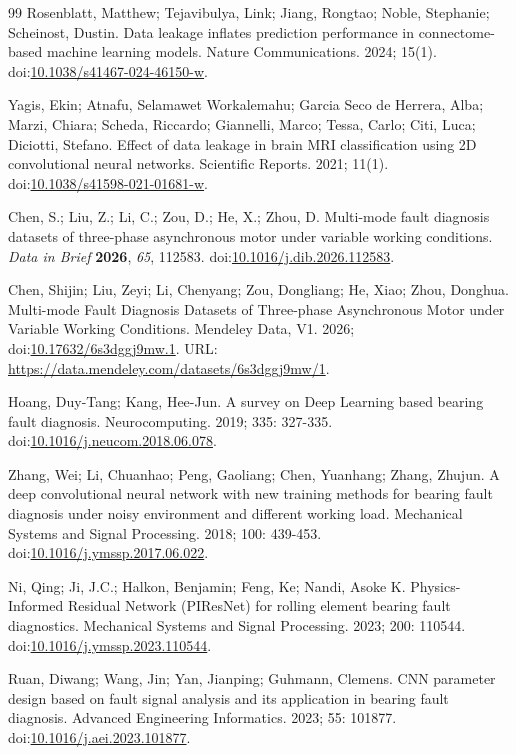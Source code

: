 \documentclass[11pt]{article}
\begin{document}
\begin{thebibliography}{99}
 Rosenblatt, Matthew; Tejavibulya, Link; Jiang, Rongtao; Noble, Stephanie; Scheinost, Dustin. Data leakage inflates prediction performance in connectome-based machine learning models. Nature Communications. 2024; 15(1). doi:\url{10.1038/s41467-024-46150-w}.

 Yagis, Ekin; Atnafu, Selamawet Workalemahu; Garcia Seco de Herrera, Alba; Marzi, Chiara; Scheda, Riccardo; Giannelli, Marco; Tessa, Carlo; Citi, Luca; Diciotti, Stefano. Effect of data leakage in brain MRI classification using 2D convolutional neural networks. Scientific Reports. 2021; 11(1). doi:\url{10.1038/s41598-021-01681-w}.

 Chen, S.; Liu, Z.; Li, C.; Zou, D.; He, X.; Zhou, D. Multi-mode fault diagnosis datasets of three-phase asynchronous motor under variable working conditions. \textit{Data in Brief} \textbf{2026}, \textit{65}, 112583. doi:\url{10.1016/j.dib.2026.112583}.

 Chen, Shijin; Liu, Zeyi; Li, Chenyang; Zou, Dongliang; He, Xiao; Zhou, Donghua. Multi-mode Fault Diagnosis Datasets of Three-phase Asynchronous Motor under Variable Working Conditions. Mendeley Data, V1. 2026; doi:\url{10.17632/6s3dggj9mw.1}. URL: \url{https://data.mendeley.com/datasets/6s3dggj9mw/1}.

 Hoang, Duy-Tang; Kang, Hee-Jun. A survey on Deep Learning based bearing fault diagnosis. Neurocomputing. 2019; 335: 327-335. doi:\url{10.1016/j.neucom.2018.06.078}.

 Zhang, Wei; Li, Chuanhao; Peng, Gaoliang; Chen, Yuanhang; Zhang, Zhujun. A deep convolutional neural network with new training methods for bearing fault diagnosis under noisy environment and different working load. Mechanical Systems and Signal Processing. 2018; 100: 439-453. doi:\url{10.1016/j.ymssp.2017.06.022}.

 Ni, Qing; Ji, J.C.; Halkon, Benjamin; Feng, Ke; Nandi, Asoke K. Physics-Informed Residual Network (PIResNet) for rolling element bearing fault diagnostics. Mechanical Systems and Signal Processing. 2023; 200: 110544. doi:\url{10.1016/j.ymssp.2023.110544}.

 Ruan, Diwang; Wang, Jin; Yan, Jianping; Guhmann, Clemens. CNN parameter design based on fault signal analysis and its application in bearing fault diagnosis. Advanced Engineering Informatics. 2023; 55: 101877. doi:\url{10.1016/j.aei.2023.101877}.


\end{thebibliography}
\end{document}
